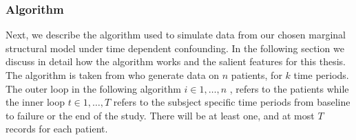 \documentclass[11pt]{article}
\begin{document}
\subsubsection{Algorithm}\label{algorithm}

Next, we describe the algorithm used to simulate data from our chosen
marginal structural model under time dependent confounding. In the
following section we discuss in detail how the algorithm works and the
salient features for this thesis. The algorithm is taken from
\citet{Havercroft2012} who generate data on \(n\) patients, for \(k\)
time periods. The outer loop in the following algorithm
\(i \in {1, \dots, n}\) , refers to the patients while the inner loop
\(t \in {1, \dots, T}\) refers to the subsject specific time periods
from baseline to failure or the end of the study. There will be at least
one, and at most \(T\) records for each patient.
\end{document}
